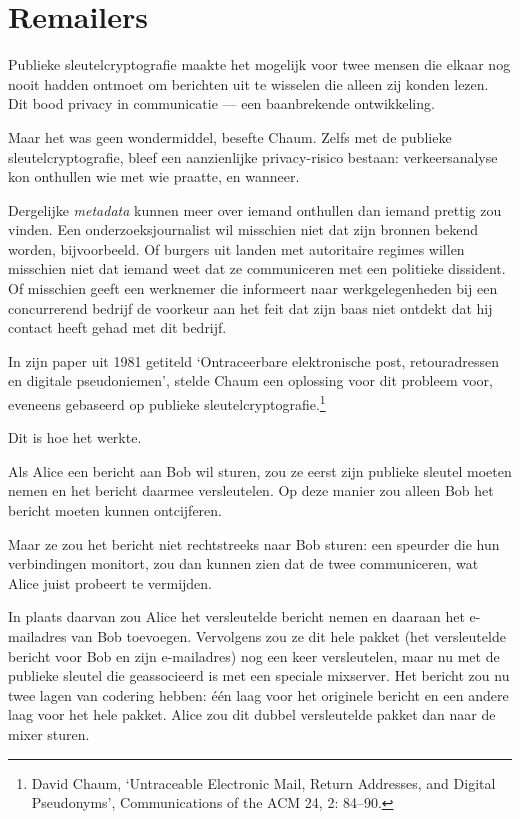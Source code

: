 \documentclass[smalldemyvopaper,11pt,twoside,onecolumn,openright,extrafontsizes,hidelinks]{memoir}
\begin{document}
\section{Remailers}\label{remailers}

Publieke sleutelcryptografie maakte het mogelijk voor twee mensen die
elkaar nog nooit hadden ontmoet om berichten uit te wisselen die alleen
zij konden lezen. Dit bood privacy in communicatie --- een baanbrekende
ontwikkeling.

Maar het was geen wondermiddel, besefte Chaum. Zelfs met de publieke
sleutelcryptografie, bleef een aanzienlijke privacy-risico bestaan:
verkeersanalyse kon onthullen wie met wie praatte, en wanneer.

Dergelijke \emph{metadata} kunnen meer over iemand onthullen dan iemand
prettig zou vinden. Een onderzoeksjournalist wil misschien niet dat zijn
bronnen bekend worden, bijvoorbeeld. Of burgers uit landen met
autoritaire regimes willen misschien niet dat iemand weet dat ze
communiceren met een politieke dissident. Of misschien geeft een
werknemer die informeert naar werkgelegenheden bij een concurrerend
bedrijf de voorkeur aan het feit dat zijn baas niet ontdekt dat hij
contact heeft gehad met dit bedrijf.

In zijn paper uit 1981 getiteld `Ontraceerbare elektronische post,
retouradressen en digitale pseudoniemen', stelde Chaum een oplossing
voor dit probleem voor, eveneens gebaseerd op publieke
sleutelcryptografie.\footnote{David Chaum, `Untraceable Electronic Mail,
  Return Addresses, and Digital Pseudonyms', Communications of the ACM
  24, 2: 84--90.}

Dit is hoe het werkte.

Als Alice een bericht aan Bob wil sturen, zou ze eerst zijn publieke
sleutel moeten nemen en het bericht daarmee versleutelen. Op deze manier
zou alleen Bob het bericht moeten kunnen ontcijferen.

Maar ze zou het bericht niet rechtstreeks naar Bob sturen: een speurder
die hun verbindingen monitort, zou dan kunnen zien dat de twee
communiceren, wat Alice juist probeert te vermijden.

In plaats daarvan zou Alice het versleutelde bericht nemen en daaraan
het e-mailadres van Bob toevoegen. Vervolgens zou ze dit hele pakket
(het versleutelde bericht voor Bob en zijn e-mailadres) nog een keer
versleutelen, maar nu met de publieke sleutel die geassocieerd is met
een speciale mixserver. Het bericht zou nu twee lagen van codering
hebben: één laag voor het originele bericht en een andere laag voor het
hele pakket. Alice zou dit dubbel versleutelde pakket dan naar de mixer
sturen.
\end{document}

